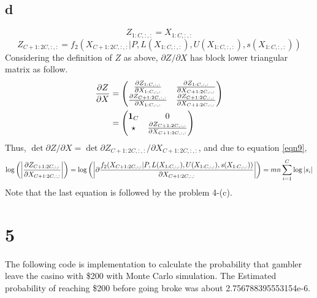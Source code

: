 \documentclass[10pt]{article}
\begin{document}
\subsection*{d}
\begin{equation}
    Z_{1:C,:,:} = X_{1:C,:,:}
\end{equation}
\begin{equation}
    Z_{C+1:2C,:,:} = f_2(X_{C+1:2C,:,:}|P, L(X_{1:C,:,:}), U(X_{1:C,:,:}),s(X_{1:C,:,:}))
    \label{eqn9}
\end{equation}
Considering the definition of $Z$ as above, $\partial Z /\partial X$ has block lower triangular matrix as follow.
\begin{align*}
    {\partial Z \over \partial X} &= \begin{pmatrix}
        {\partial Z_{1:C,:,:} \over \partial X_{1:C,:,:}} & {\partial Z_{1:C,:,:} \over  \partial X_{C+1:2C,:,:}} \\
        {\partial Z_{C+1:2C,:,:} \over \partial X_{1:C,:,:}} & {\partial Z_{C+1:2C,:,:} \over \partial X_{C+1:2C,:,:}}
    \end{pmatrix} \\
    &= \begin{pmatrix}
        \boldsymbol{1}_{C} & 0 \\
        \star & {\partial Z_{C+1:2C,:,:} \over \partial X_{C+1:2C,:,:}}
    \end{pmatrix}
\end{align*}
Thus, $\det {\partial Z / \partial X} = \det {\partial Z_{C+1:2C,:,:} / \partial X_{C+1:2C,:,:}}$, and due to equation \ref{eqn9}, 
\begin{equation}
   \log \left(\left| {\partial Z_{C+1:2C,:,:} \over \partial X_{C+1:2C,:,:}}\right|\right) =\log\left( \left|\partial {f_2(X_{C+1:2C,:,:}|P, L(X_{1:C,:,:}), U(X_{1:C,:,:}),s(X_{1:C,:,:}))\over \partial X_{C+1:2C,:,:}}\right|\right) = mn \sum_{i=1}^C\log |s_i|
\end{equation}
Note that the last equation is followed by the problem 4-(c).

\section*{5}
The following code is implementation to calculate the probability that gambler leave the casino with \$200 with Monte Carlo simulation.
The Estimated probability of reaching \$200 before going broke was about 2.756788395553154e-6.
\end{document}
